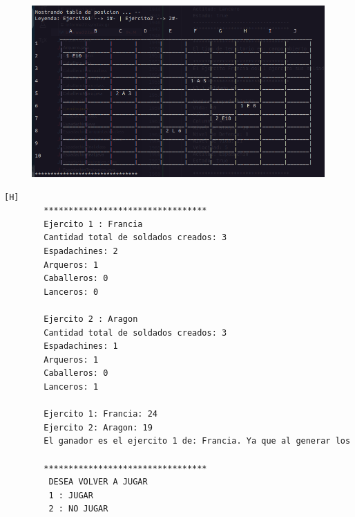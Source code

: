 \documentclass{article}
\begin{document}
	\begin{figure}[H]
		\centering
		\includegraphics[width=1.0\textwidth,keepaspectratio]{img/Commit9.png}
	\end{figure}
	\begin{lstlisting}[language=bash,caption={Ejecucion:}][H]
		*********************************
		Ejercito 1 : Francia
		Cantidad total de soldados creados: 3
		Espadachines: 2
		Arqueros: 1
		Caballeros: 0
		Lanceros: 0
		
		Ejercito 2 : Aragon
		Cantidad total de soldados creados: 3
		Espadachines: 1
		Arqueros: 1
		Caballeros: 0
		Lanceros: 1
		
		Ejercito 1: Francia: 24
		Ejercito 2: Aragon: 19
		El ganador es el ejercito 1 de: Francia. Ya que al generar los porcentajes de probabilidad de victoria basada en los niveles de vida de sus soldados y aplicando un experimento aleatorio salio vencedor. (Aleatorio generado : 55.81)
		
		*********************************
		 DESEA VOLVER A JUGAR
		 1 : JUGAR
		 2 : NO JUGAR
			
	\end{lstlisting}
\end{document}
